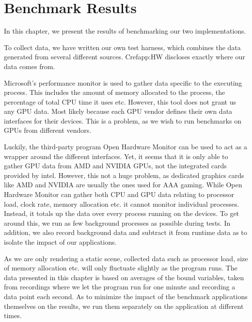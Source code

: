 \chapter{Benchmark Results}\label{ch:test_results}
\begin{chaptermeta}
In this chapter, we present the results of benchmarking our two implementations.
\end{chaptermeta}

To collect data, we have written our own test harness, which combines the data generated from several different sources.
Cref{app:HW} discloses exactly where our data comes from.


Microsoft’s performance monitor is used to gather data specific to the executing process.
This includes the amount of memory allocated to the process, the percentage of total \gls{CPU} time it uses etc.
However, this tool does not grant us any \gls{GPU} data.
Most likely because each \gls{GPU} vendor defines their own data interfaces for their devices.
This is a problem, as we wish to run benchmarks on \glspl{GPU} from different vendors.


Luckily, the third-party program Open Hardware Monitor can be used to act as a wrapper around the different interfaces.
Yet, it seems that it is only able to gather \gls{GPU} data from AMD and NVIDIA \glspl{GPU}, not the integrated cards provided by intel.
However, this not a huge problem, as dedicated graphics cards like AMD and NVIDIA are usually the ones used for AAA gaming. 
While Open Hardware Monitor can gather both \gls{CPU} and \gls{GPU} data relating to processor load, clock rate, memory allocation etc. it cannot monitor individual processes.
Instead, it totals up the data over every process running on the devices. To get around this, we run as few background processes as possible during tests.
In addition, we also record background data and subtract it from runtime data as to isolate the impact of our applications. 


As we are only rendering a static scene, collected data such as processor load, size of memory allocation etc. will only fluctuate slightly as the program runs.
The data presented in this chapter is based on averages of the bound variables, taken from recordings where we let the program run for one minute and recording a data point each second. 
As to minimize the impact of the benchmark applications themselves on the results, we run them separately on the application at different times.


